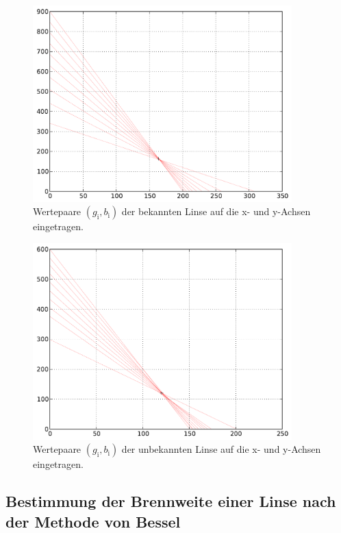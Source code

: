 		\begin{figure}[h!]
			\centering
			\includegraphics[width = 10cm]{img/graph_bekannt.pdf}
			\caption{Wertepaare $(g_\mathrm{i}, b_\mathrm{i})$ der bekannten Linse auf die x- und y-Achsen eingetragen.}
			\label{fig:graph_bekannt}
		\end{figure}

		\begin{figure}[h!]
			\centering
			\includegraphics[width = 10cm]{img/graph_unbekannt.pdf}
			\caption{Wertepaare $(g_\mathrm{i}, b_\mathrm{i})$ der unbekannten Linse auf die x- und y-Achsen eingetragen.}
			\label{fig:graph_unbekannt}
		\end{figure}

	\clearpage

	\subsection{Bestimmung der Brennweite einer Linse nach der Methode von Bessel}
		\label{subsec:bessel}

